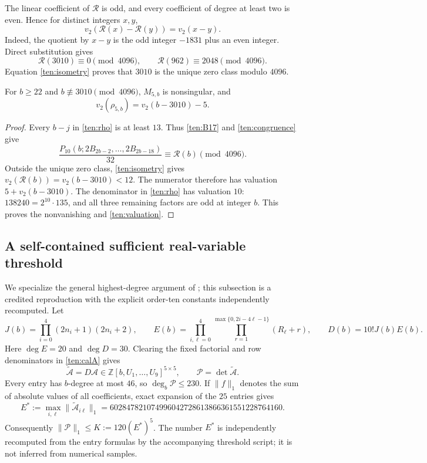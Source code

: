 The linear coefficient of $\mathcal R$ is odd, and every coefficient
of degree at least two is even.  Hence for distinct integers $x,y$,
\begin{equation}\label{ten:isometry}
 v_2(\mathcal R(x)-\mathcal R(y))=v_2(x-y).
\end{equation}
Indeed, the quotient by $x-y$ is the odd integer $-1831$ plus an
even integer.  Direct substitution gives
\[
 \mathcal R(3010)\equiv0\pmod{4096},\qquad
 \mathcal R(962)\equiv2048\pmod{4096}.
\]
Equation \eqref{ten:isometry} proves that $3010$ is the unique
zero class modulo $4096$.

\begin{proposition}\label{ten:range}
For $b\ge22$ and $b\not\equiv3010\pmod{4096}$,
$M_{5,b}$ is nonsingular, and
\begin{equation}\label{ten:valuation}
 v_2(\rho_{5,b})=v_2(b-3010)-5.
\end{equation}
\end{proposition}
\begin{proof}
Every $b-j$ in \eqref{ten:rho} is at least $13$.  Thus
\eqref{ten:B17} and \eqref{ten:congruence} give
\[
 \frac{P_{10}(b;2B_{2b-2},\ldots,2B_{2b-18})}{32}
          \equiv\mathcal R(b)\pmod{4096}.
\]
Outside the unique zero class, \eqref{ten:isometry} gives
$v_2(\mathcal R(b))=v_2(b-3010)<12$.
The numerator therefore has valuation $5+v_2(b-3010)$.
The denominator in \eqref{ten:rho} has valuation $10$:
$138240=2^{10}\cdot135$, and all three remaining factors are odd
at integer $b$.  This proves the nonvanishing and
\eqref{ten:valuation}.
\end{proof}

\subsection{A self-contained sufficient real-variable threshold}

We specialize the general highest-degree argument of
\cite{QuarticIncoming}; this subsection is a credited reproduction
with the explicit order-ten constants independently recomputed.
Let
\[
 J(b)=\prod_{i=0}^{4}(2n_i+1)(2n_i+2),\qquad
 E(b)=\prod_{i,\ell=0}^{4}\prod_{r=1}^{\max\{0,2i-4\ell-1\}}
                  (R_\ell+r),\qquad D(b)=10!J(b)E(b).
\]
Here $\deg E=20$ and $\deg D=30$.  Clearing the fixed factorial
and row denominators in \eqref{ten:calA} gives
\[
 \widetilde{\mathcal A}=D\mathcal A
     \in\mathbb Z[b,U_1,\ldots,U_9]^{5\times5},\qquad
 \mathscr P=\det\widetilde{\mathcal A}.
\]
Every entry has $b$-degree at most $46$, so $\deg_b\mathscr P\le230$.
If $\|f\|_1$ denotes the sum of absolute values of all coefficients,
exact expansion of the $25$ entries gives
\[
 E^*:=\max_{i,\ell}\|\widetilde{\mathcal A}_{i\ell}\|_1
 =602847821074996042728613866361551228764160.
\]
Consequently $\|\mathscr P\|_1\le K:=120(E^*)^5$.
The number $E^*$ is independently recomputed from the entry formulas
by the accompanying threshold script; it is not inferred from
numerical samples.

